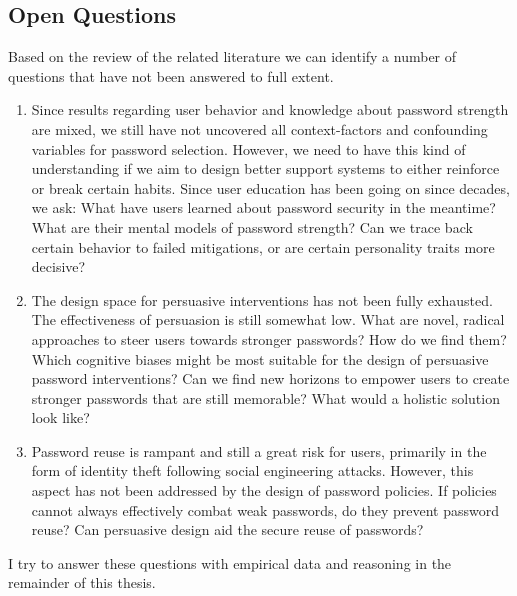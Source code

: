 \subsection{Open Questions}
Based on the review of the related literature we can identify a number of questions that have not been answered to full extent. 
\begin{enumerate}
	\item Since results regarding user behavior and knowledge about password strength are mixed, we still have not uncovered all context-factors and confounding variables for password selection. However, we need to have this kind of understanding if we aim to design better support systems to either reinforce or break certain habits. Since user education has been going on since decades, we ask: What have users learned about password security in the meantime? What are their mental models of password strength? Can we trace back certain behavior to failed mitigations, or are certain personality traits more decisive?
	
	\item The design space for persuasive interventions has not been fully exhausted. The effectiveness of persuasion is still somewhat low. What are novel, radical approaches to steer users towards stronger passwords? How do we find them? Which cognitive biases might be most suitable for the design of persuasive password interventions? Can we find new horizons to empower users to create stronger passwords that are still memorable? What would a holistic solution look like?
	
	\item Password reuse is rampant and still a great risk for users, primarily in the form of identity theft following social engineering attacks. However, this aspect has not been addressed by the design of password policies. If policies cannot always effectively combat weak passwords, do they prevent password reuse? Can persuasive design aid the secure reuse of passwords?
\end{enumerate}

I try to answer these questions with empirical data and reasoning in the remainder of this thesis.



